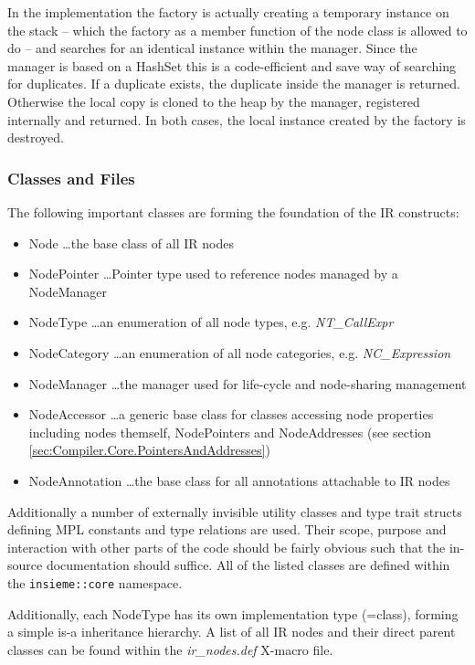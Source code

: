In the implementation the factory is actually creating a temporary instance on
the stack -- which the factory as a member function of the node class is
allowed to do -- and searches for an identical instance within the manager.
Since the manager is based on a HashSet this is a code-efficient and save way of
searching for duplicates. If a duplicate exists, the duplicate inside the
manager is returned. Otherwise the local copy is cloned to the heap by the
manager, registered internally and returned. In both cases, the local instance
created by the factory is destroyed.


\subsubsection{Classes and Files}
The following important classes are forming the foundation of the IR
constructs:
\begin{itemize}
  \item Node \ldots the base class of all IR nodes
  \item NodePointer \ldots Pointer type used to reference nodes managed by a
  NodeManager
  \item NodeType \ldots an enumeration of all node types, e.g.
  \textit{NT\_CallExpr}
  \item NodeCategory \ldots an enumeration of all node categories, e.g.
  \textit{NC\_Expression}
  \item NodeManager \ldots the manager used for life-cycle and node-sharing
  management
  \item NodeAccessor \dots a generic base class for classes accessing node
  properties including nodes themself, NodePointers and NodeAddresses (see
  section \ref{sec:Compiler.Core.PointersAndAddresses})
  \item NodeAnnotation \dots the base class for all annotations attachable to
  IR nodes
\end{itemize}
Additionally a number of externally invisible utility classes and type trait
structs defining MPL constants and type relations are used. Their scope, purpose
and interaction with other parts of the code should be fairly obvious such
that the in-source documentation should suffice. All of the listed classes are
defined within the \lstinline|insieme::core| namespace.

Additionally, each NodeType has its own implementation type (=class), forming a
simple is-a inheritance hierarchy. A list of all IR nodes and their direct
parent classes can be found within the \textit{ir\_nodes.def} X-macro file.

